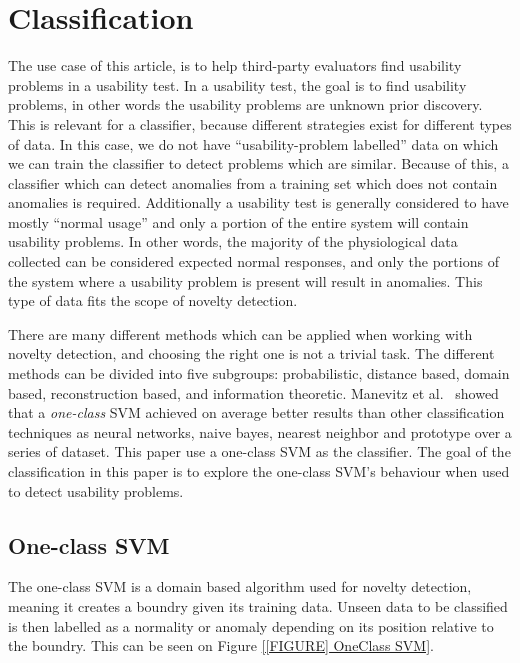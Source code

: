 \section{Classification}
The use case of this article, is to help third-party evaluators find usability problems in a usability test.
In a usability test, the goal is to find usability problems, in other words the usability problems are unknown prior discovery. This is relevant for a classifier, because different strategies exist for different types of data. In this case, we do not have ``usability-problem labelled'' data on which we can train the classifier to detect problems which are similar. Because of this, a classifier which can detect anomalies from a training set which does not contain anomalies is required.
Additionally a usability test is generally considered to have mostly ``normal usage'' and only a portion of the entire system will contain usability problems. In other words, the majority of the physiological data collected can be considered expected normal responses, and only the portions of the system where a usability problem is present will result in anomalies.
This type of data fits the scope of novelty detection\cite{noveltyDetection}.

There are many different methods which can be applied when working with novelty detection\cite{noveltyDetection}, and choosing the right one is not a trivial task.
The different methods can be divided into five subgroups: probabilistic, distance based, domain based, reconstruction based, and information theoretic.
Manevitz et al.~\cite{oneClassSVM} showed that a \textit{one-class} SVM achieved on average better results than other classification techniques as neural networks, naive bayes, nearest neighbor and prototype over a series of dataset.
This paper use a one-class SVM as the classifier.
The goal of the classification in this paper is to explore the one-class SVM's behaviour when used to detect usability problems.

\subsection{One-class SVM}
The one-class SVM is a domain based algorithm used for novelty detection, meaning it creates a boundry given its training data.
Unseen data to be classified is then labelled as a normality or anomaly depending on its position relative to the boundry.
This can be seen on Figure \ref{[FIGURE] OneClass SVM}.

